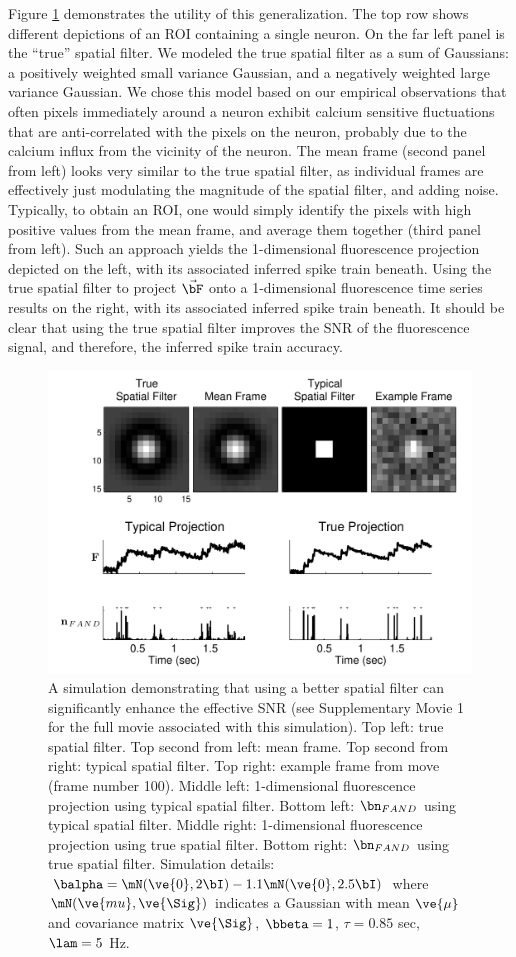 Figure \ref{fig:spatial} demonstrates the utility of this generalization.  The top row shows different depictions of an ROI containing a single neuron.  On the far left panel is the ``true'' spatial filter.  We modeled the true spatial filter as a sum of Gaussians: a positively weighted small variance Gaussian, and a negatively weighted large variance Gaussian.  We chose this model based on our empirical observations that often pixels immediately around a neuron exhibit calcium sensitive fluctuations that are anti-correlated with the pixels on the neuron, probably due to the calcium influx from the vicinity of the neuron. The mean frame (second panel from left) looks very similar to the true spatial filter, as individual frames are effectively just modulating the magnitude of the spatial filter, and adding noise.  Typically, to obtain an ROI, one would simply identify the pixels with high positive values from the mean frame, and average them together (third panel from left).  Such an approach yields the 1-dimensional fluorescence projection depicted on the left, with its associated inferred spike train beneath.  Using the true spatial filter to project $\vec{\bF}$ onto a 1-dimensional fluorescence time series results on the right, with its associated inferred spike train beneath.  It should be clear that using the true spatial filter improves the SNR of the fluorescence signal, and therefore, the inferred spike train accuracy.

\begin{figure}[H]
\centering \includegraphics[width=.9\linewidth]{../figs/spatial}
\caption{A simulation demonstrating that using a better spatial filter can significantly enhance the effective SNR (see Supplementary Movie 1 for the full movie associated with this simulation).  Top left: true spatial filter.  Top second from left: mean frame.  Top second from right: typical spatial filter.   Top right: example frame from move (frame number 100).  Middle left: 1-dimensional fluorescence projection using typical spatial filter.  Bottom left: $\bn_{FAND}$ using typical spatial filter.  Middle right: 1-dimensional fluorescence projection using true spatial filter.  Bottom right: $\bn_{FAND}$ using true spatial filter. Simulation details: $\balpha=\mN(\ve{0},2 \bI)-1.1 \mN(\ve{0},2.5 \bI)$ where $\mN(\ve{mu},\ve{\Sig})$ indicates a Gaussian with mean $\ve{\mu}$ and covariance matrix $\ve{\Sig}$, $\bbeta=1$, $\tau=0.85$ sec, $\lam=5$ Hz.} \label{fig:spatial} \end{figure} 
